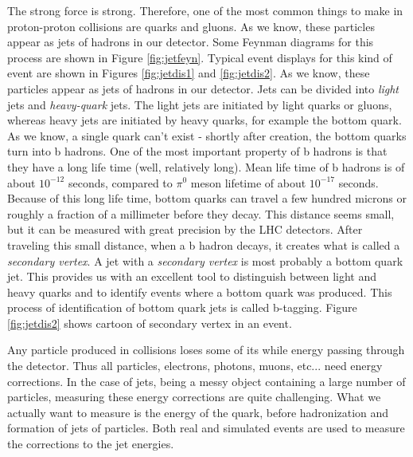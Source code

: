 The strong force is strong. Therefore, one of the most common things to make in proton-proton collisions are quarks and gluons.  As we know, these particles appear as jets of hadrons in our detector. Some Feynman diagrams for this process are shown in Figure \ref{fig:jetfeyn}. Typical event displays for this kind of event are shown in Figures \ref{fig:jetdis1} and \ref{fig:jetdis2}.  As we know, these particles appear as jets of hadrons in our detector. Jets can be divided  into  {\it light} jets and {\it heavy-quark} jets.  The light jets are initiated by light quarks or gluons, whereas heavy jets are initiated by heavy quarks, for example the bottom quark. As we know, a single quark can't exist - shortly after creation, the bottom quarks turn into b hadrons. One of the most important property of b hadrons is that they have a long life time (well, relatively long). Mean life time of b hadrons is of about  $10^{-12}$ seconds, compared to $\pi^0$ meson lifetime of about $10^{-17}$ seconds. Because of this long life time, bottom quarks can travel a few hundred microns or roughly a fraction of a millimeter before they decay. This distance seems small, but it can be measured with great precision by the LHC detectors. After traveling this small distance, when a b hadron decays, it creates what is called a {\it secondary vertex}. A jet with a {\it secondary vertex} is most probably a bottom quark jet. This provides us with an excellent tool to distinguish between light and heavy quarks and to identify events where a bottom quark was produced. This process of identification of bottom quark jets is called {b-tagging}. Figure \ref{fig:jetdis2}  shows cartoon of  secondary vertex in an event.
 

Any particle produced in collisions loses some of its while energy passing through the detector. Thus all particles, electrons, photons, muons, etc... need energy corrections. In the case of jets, being a messy object containing a large number of particles, measuring these energy corrections are quite challenging.  What we actually want to measure is the energy of the quark, before hadronization and formation of jets of particles.  Both real and simulated events are used to measure the corrections to the jet energies.


